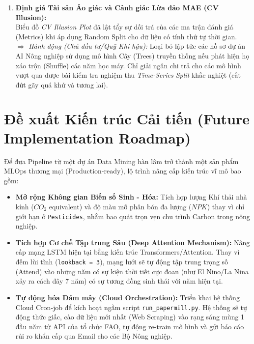 \begin{enumerate}
    \item \textbf{Định giá Tài sản Ảo giác và Cảnh giác Lừa đảo MAE (CV Illusion):}
    \\Biểu đồ \textit{CV Illusion Plot} đã lật tẩy sự dối trá của các ma trận đánh giá (Metrics) khi áp dụng Random Split cho dữ liệu có tính thứ tự thời gian.
    \\$\Rightarrow$ \textit{Hành động (Chủ đầu tư/Quỹ Khí hậu):} Loại bỏ lập tức các hồ sơ dự án AI Nông nghiệp sử dụng mô hình Cây (Trees) truyền thống nếu phát hiện họ xáo trộn (Shuffle) các năm học máy. Chỉ giải ngân chi trả cho các mô hình vượt qua được bài kiểm tra nghiệm thu \textit{Time-Series Split} khắc nghiệt (cắt đứt gãy quá khứ và tương lai).
\end{enumerate}

\section{Đề xuất Kiến trúc Cải tiến (Future Implementation Roadmap)}

Để đưa Pipeline từ một dự án Data Mining hàn lâm trở thành một sản phẩm MLOps thương mại (Production-ready), lộ trình nâng cấp kiến trúc vĩ mô bao gồm:
\begin{itemize}
    \item \textbf{Mở rộng Không gian Biến số Sinh - Hóa:} Tích hợp lượng Khí thải nhà kính ($CO_2$ equivalent) và độ màu mỡ phân bón đa lượng ($NPK$) thay vì chỉ giới hạn ở \texttt{Pesticides}, nhằm bao quát trọn vẹn chu trình Carbon trong nông nghiệp.
    \item \textbf{Tích hợp Cơ chế Tập trung Sâu (Deep Attention Mechanism):} Nâng cấp mạng LSTM hiện tại bằng kiến trúc Transformers/Attention. Thay vì đếm lùi tĩnh (\texttt{lookback = 3}), mạng lưới sẽ tự động tập trung trọng số (Attend) vào những năm có sự kiện thời tiết cực đoan (như El Nino/La Nina xảy ra cách đây 7 năm) có sự tương đồng sinh thái với năm hiện tại.
    \item \textbf{Tự động hóa Đám mây (Cloud Orchestration):} Triển khai hệ thống Cloud Cron-job để kích hoạt ngầm script \texttt{run\_papermill.py}. Hệ thống sẽ tự động thức giấc, cào dữ liệu mới nhất (Web Scraping) vào rạng sáng mùng 1 đầu năm từ API của tổ chức FAO, tự động re-train mô hình và gửi báo cáo rủi ro khẩn cấp qua Email cho các Bộ Nông nghiệp.
\end{itemize}